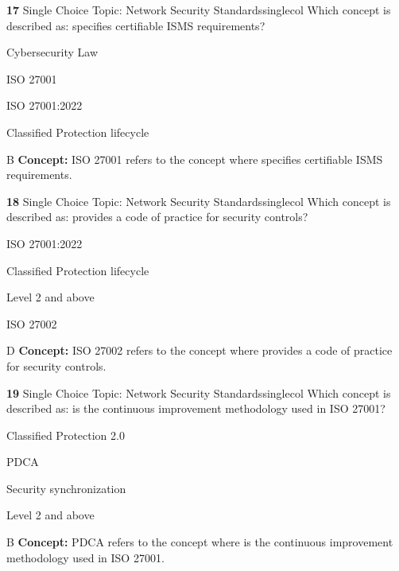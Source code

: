 \documentclass[10pt,a4paper]{article}
\begin{document}
\begin{qcard}{\color{white}\textbf{17} \hfill \small Single Choice \textbar{} Topic: Network Security Standards}{singlecol}
Which concept is described as: specifies certifiable ISMS requirements?

\begin{qoptions}
\item Cybersecurity Law
\item ISO 27001
\item ISO 27001:2022
\item Classified Protection lifecycle
\end{qoptions}
\begin{explainbox}{B}
\textbf{Concept:} ISO 27001 refers to the concept where specifies certifiable ISMS requirements.
\end{explainbox}
\end{qcard}

\begin{qcard}{\color{white}\textbf{18} \hfill \small Single Choice \textbar{} Topic: Network Security Standards}{singlecol}
Which concept is described as: provides a code of practice for security controls?

\begin{qoptions}
\item ISO 27001:2022
\item Classified Protection lifecycle
\item Level 2 and above
\item ISO 27002
\end{qoptions}
\begin{explainbox}{D}
\textbf{Concept:} ISO 27002 refers to the concept where provides a code of practice for security controls.
\end{explainbox}
\end{qcard}

\begin{qcard}{\color{white}\textbf{19} \hfill \small Single Choice \textbar{} Topic: Network Security Standards}{singlecol}
Which concept is described as: is the continuous improvement methodology used in ISO 27001?

\begin{qoptions}
\item Classified Protection 2.0
\item PDCA
\item Security synchronization
\item Level 2 and above
\end{qoptions}
\begin{explainbox}{B}
\textbf{Concept:} PDCA refers to the concept where is the continuous improvement methodology used in ISO 27001.
\end{explainbox}
\end{qcard}
\end{document}
